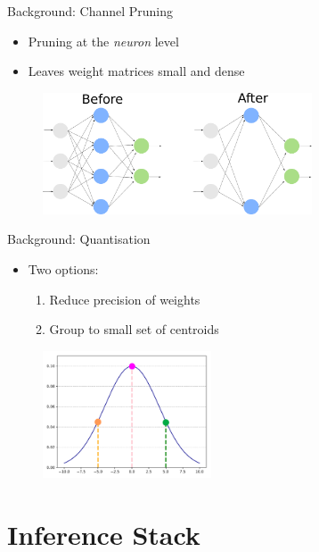 \documentclass{beamer}
\begin{document}
\begin{frame}{Background: Channel Pruning}

\begin{itemize}
    \item Pruning at the \textit{neuron} level
    \item Leaves weight matrices small and dense
\end{itemize}

\begin{figure}
    \centering
    \includegraphics[width=8cm]{images/channel_pruning.pdf}
    \label{fig:channel_pruning}
\end{figure}

\end{frame}


\begin{frame}{Background: Quantisation}
\begin{itemize}
    \item Two options:
    \begin{enumerate}
        \item Reduce precision of weights
        \item Group to small set of centroids
    \end{enumerate}
\end{itemize}

\begin{figure}
    \centering
    \includegraphics[width=5cm]{images/quantization.pdf}
\end{figure}


\end{frame}


\section{Inference Stack}
\end{document}
